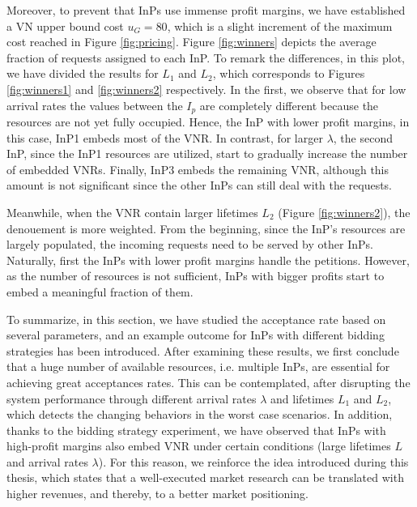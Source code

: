 Moreover, to prevent that InPs use immense profit margins, we have established a VN upper bound cost $u_G = 80$, which is a slight increment of the maximum cost reached in Figure \ref{fig:pricing}. Figure \ref{fig:winners} depicts the average fraction of requests assigned to each InP. To remark the differences, in this plot, we have divided the results for $L_1$ and $L_2$, which corresponds to Figures \ref{fig:winners1} and \ref{fig:winners2} respectively. In the first, we observe that for low arrival rates the values between the $I_p$ are completely different because the resources are not yet fully occupied. Hence, the InP with lower profit margins, in this case, InP1 embeds most of the VNR. In contrast, for larger $\lambda$, the second InP, since the InP1 resources are utilized, start to gradually increase the number of embedded VNRs. Finally, InP3 embeds the remaining VNR, although this amount is not significant since the other InPs can still deal with the requests.

Meanwhile, when the VNR contain larger lifetimes $L_2$ (Figure \ref{fig:winners2}), the denouement is more weighted. From the beginning, since the InP's resources are largely populated, the incoming requests need to be served by other InPs. Naturally, first the InPs with lower profit margins handle the petitions. However, as the number of resources is not sufficient, InPs with bigger profits start to embed a meaningful fraction of them.

To summarize, in this section, we have studied the acceptance rate based on several parameters, and an example outcome for InPs with different bidding strategies has been introduced. After examining these results, we first conclude that a huge number of available resources, i.e. multiple InPs, are essential for achieving great acceptances rates. This can be contemplated, after disrupting the system performance through different arrival rates $\lambda$ and lifetimes $L_1$ and $L_2$, which detects the changing behaviors in the worst case scenarios. In addition, thanks to the bidding strategy experiment, we have observed that InPs with high-profit margins also embed VNR under certain conditions (large lifetimes $L$ and arrival rates $\lambda$). For this reason, we reinforce the idea introduced during this thesis, which states that a well-executed market research can be translated with higher revenues, and thereby, to a better market positioning.

